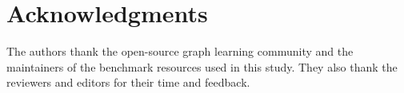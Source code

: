 \section*{Acknowledgments}

The authors thank the open-source graph learning community and the maintainers of the benchmark resources used in this study. They also thank the reviewers and editors for their time and feedback.
